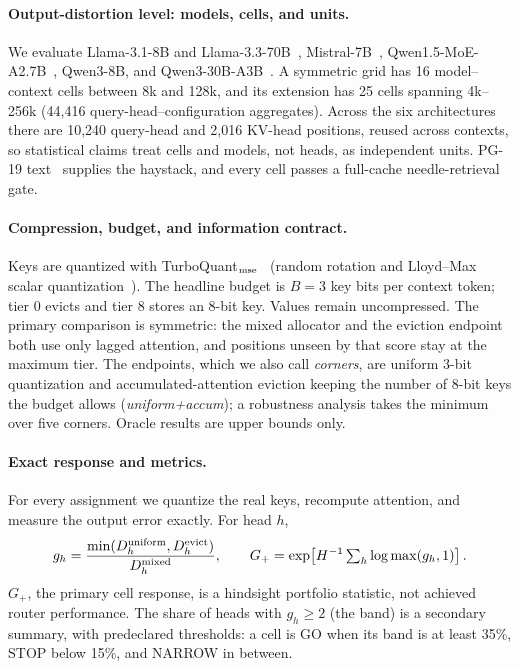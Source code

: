 \documentclass{article}
\newcommand{\gplus}{G_{+}}
\theoremstyle{definition}
\begin{document}
\paragraph{Output-distortion level: models, cells, and units.}
We evaluate Llama-3.1-8B and Llama-3.3-70B~\citep{grattafiori2024llama3}, Mistral-7B~\citep{jiang2023mistral}, Qwen1.5-MoE-A2.7B~\citep{qwen2024moe}, Qwen3-8B, and Qwen3-30B-A3B~\citep{yang2025qwen3}.  A symmetric grid has 16 model--context cells between 8k and 128k, and its extension has 25 cells spanning 4k--256k (44,416 query-head--configuration aggregates).  Across the six architectures there are 10,240 query-head and 2,016 KV-head positions, reused across contexts, so statistical claims treat cells and models, not heads, as independent units.  PG-19 text~\citep{rae2020pg19} supplies the haystack, and every cell passes a full-cache needle-retrieval gate.

\paragraph{Compression, budget, and information contract.}
Keys are quantized with TurboQuant$_{\rm mse}$~\citep{zandieh2025turboquant} (random rotation and Lloyd--Max scalar quantization~\citep{lloyd1982least}).  The headline budget is $B=3$ key bits per context token; tier 0 evicts and tier 8 stores an 8-bit key.  Values remain uncompressed.  The primary comparison is symmetric: the mixed allocator and the eviction endpoint both use only lagged attention, and positions unseen by that score stay at the maximum tier.  The endpoints, which we also call \emph{corners}, are uniform 3-bit quantization and accumulated-attention eviction keeping the number of 8-bit keys the budget allows (\emph{uniform+accum}); a robustness analysis takes the minimum over five corners.  Oracle results are upper bounds only.

\paragraph{Exact response and metrics.}
For every assignment we quantize the real keys, recompute attention, and measure the output error exactly.  For head $h$,
\begin{equation}
 g_h=\frac{\min(D_h^{\rm uniform},D_h^{\rm evict})}{D_h^{\rm mixed}},
 \qquad
 \gplus=\exp\!\left[H^{-1}\textstyle\sum_h\log\max(g_h,1)\right].
 \label{eq:metrics}
\end{equation}
$\gplus$, the primary cell response, is a hindsight portfolio statistic, not achieved router performance.  The share of heads with $g_h\ge2$ (the band) is a secondary summary, with predeclared thresholds: a cell is GO when its band is at least 35\%, STOP below 15\%, and NARROW in between.
\end{document}
